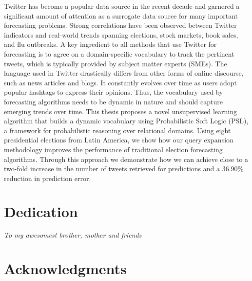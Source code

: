 \documentclass[12pt]{report}
\begin{document}
Twitter has become a popular data source in the recent decade and garnered a significant amount
of attention as a surrogate data source for many important forecasting problems.
Strong correlations have been observed between Twitter indicators
and real-world trends spanning elections,
stock markets, book sales, and flu outbreaks.
A key ingredient to all methods that use Twitter for forecasting is to agree on a domain-specific
vocabulary to track the pertinent tweets, which is typically provided by subject matter experts (SMEs).
The language used in Twitter drastically differs from other forms of online discourse,
such as news articles and blogs.
It constantly evolves over time as users adopt popular hashtags to express their opinions.
Thus, the vocabulary used by forecasting algorithms needs to be dynamic in nature and should capture emerging 
trends over time.
This thesis proposes a novel unsupervised learning algorithm that
builds a dynamic vocabulary using Probabilistic Soft Logic (PSL), a framework for probabilistic reasoning over 
relational domains. Using eight presidential elections from Latin America, we show how our query expansion methodology 
improves the performance of traditional election forecasting algorithms. 
Through this approach we demonstrate how we can achieve close to a two-fold increase in the number of tweets
retrieved for predictions and a 36.90\% reduction in prediction error. 

\vfill



\pagebreak

\chapter*{Dedication}

\vspace*{\fill}

\begin{center}
\Large\textit{To my awesomest brother, mother and friends}
\end{center}

\vspace{\fill}

\chapter*{Acknowledgments}
\end{document}

